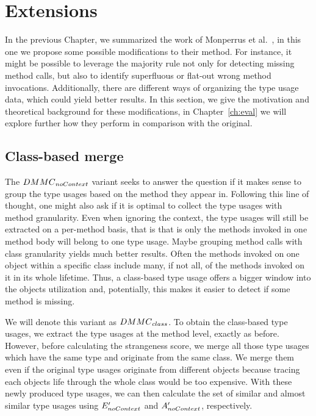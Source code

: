 \chapter{Extensions}\label{ch:ext}

In the previous Chapter, we summarized the work of Monperrus et al.~\cite{monperrus2010detecting}\cite{monperrus2013detecting}, in this one we propose some possible modifications to their method.
For instance, it might be possible to leverage the majority rule not only for detecting missing method calls, but also to identify superfluous or flat-out wrong method invocations.
Additionally, there are different ways of organizing the type usage data, which could yield better results.
In this section, we give the motivation and theoretical background for these modifications, in Chapter~\ref{ch:eval} we will explore further how they perform in comparison with the original.

\section{Class-based merge}

The $\mathnormal{DMMC}_{\mathnormal{noContext}}$ variant seeks to answer the question if it makes sense to group the type usages based on the method they appear in.
Following this line of thought, one might also ask if it is optimal to collect the type usages with method granularity.
Even when ignoring the context, the type usages will still be extracted on a per-method basis, that is that is only the methods invoked in one method body will belong to one type usage.
Maybe grouping method calls with class granularity yields much better results.
Often the methods invoked on one object within a specific class include many, if not all, of the methods invoked on it in its whole lifetime.
Thus, a class-based type usage offers a bigger window into the objects utilization and, potentially, this makes it easier to detect if some method is missing.

We will denote this variant as $\mathnormal{DMMC}_{\mathnormal{class}}$.
To obtain the class-based type usages, we extract the type usages at the method level, exactly as before.
However, before calculating the strangeness score, we merge all those type usages which have the same type and originate from the same class.
We merge them even if the original type usages originate from different objects because tracing each objects life through the whole class would be too expensive.
With these newly produced type usages, we can then calculate the set of similar and almost similar type usages using $E'_{\mathnormal{noContext}}$ and $A'_{\mathnormal{noContext}}$, respectively.

